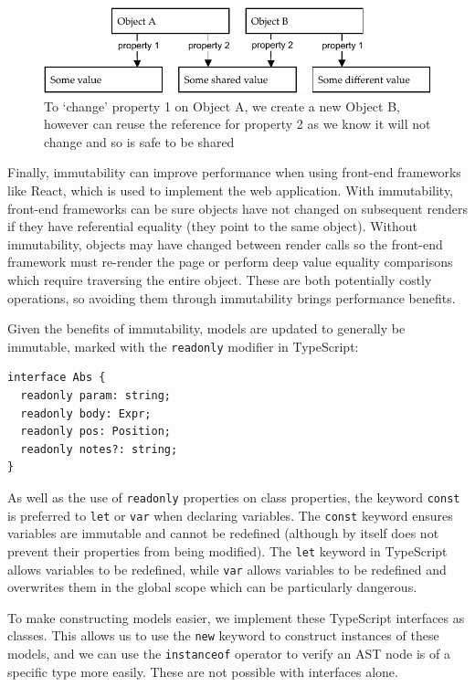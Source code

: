 \documentclass[a4paper,fleqn,oneside,12pt]{report}
\begin{document}
{\centering \begin{figure}[h!]
  \centering
  \includegraphics[width=\linewidth]{images/immutability.pdf}
  \caption{To `change' property 1 on Object A, we create a new Object B, however can reuse the reference for property 2 as we know it will not change and so is safe to be shared}
\end{figure} \par}

Finally, immutability can improve performance when using front-end frameworks like React, which is used to implement the web application. With immutability, front-end frameworks can be sure objects have not changed on subsequent renders if they have referential equality (they point to the same object). Without immutability, objects may have changed between render calls so the front-end framework must re-render the page or perform deep value equality comparisons which require traversing the entire object. These are both potentially costly operations, so avoiding them through immutability brings performance benefits.

Given the benefits of immutability, models are updated to generally be immutable, marked with the \texttt{readonly} modifier in TypeScript:

\begin{verbatim}
interface Abs {
  readonly param: string;
  readonly body: Expr;
  readonly pos: Position;
  readonly notes?: string;
}
\end{verbatim}
As well as the use of \texttt{readonly} properties on class properties, the keyword \texttt{const} is preferred to \texttt{let} or \texttt{var} when declaring variables. The \texttt{const} keyword ensures variables are immutable and cannot be redefined (although by itself does not prevent their properties from being modified). The \texttt{let} keyword in TypeScript allows variables to be redefined, while \texttt{var} allows variables to be redefined and overwrites them in the global scope which can be particularly dangerous.

To make constructing models easier, we implement these TypeScript interfaces as classes. This allows us to use the \texttt{new} keyword to construct instances of these models, and we can use the \texttt{instanceof} operator to verify an AST node is of a specific type more easily. These are not possible with interfaces alone.
\end{document}
